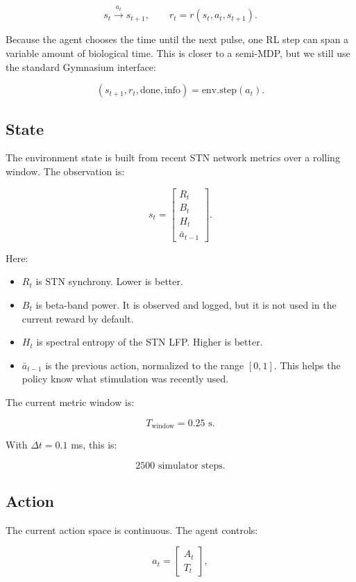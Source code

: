 \documentclass[11pt]{article}
\begin{document}
\[
s_t \xrightarrow{a_t} s_{t+1}, \qquad r_t = r(s_t, a_t, s_{t+1}).
\]

Because the agent chooses the time until the next pulse, one RL step can span a
variable amount of biological time. This is closer to a semi-MDP, but we still
use the standard Gymnasium interface:

\[
(s_{t+1}, r_t, \text{done}, \text{info}) = \text{env.step}(a_t).
\]

\subsection{State}

The environment state is built from recent STN network metrics over a rolling
window. The observation is:

\[
s_t =
\begin{bmatrix}
R_t \\
B_t \\
H_t \\
\bar{a}_{t-1}
\end{bmatrix}.
\]

Here:

\begin{itemize}[nosep]
    \item \(R_t\) is STN synchrony. Lower is better.
    \item \(B_t\) is beta-band power. It is observed and logged, but it is not
    used in the current reward by default.
    \item \(H_t\) is spectral entropy of the STN LFP. Higher is better.
    \item \(\bar{a}_{t-1}\) is the previous action, normalized to the range
    \([0, 1]\). This helps the policy know what stimulation was recently used.
\end{itemize}

The current metric window is:

\[
T_{\text{window}} = 0.25 \text{ s}.
\]

With \(\Delta t = 0.1\) ms, this is:

\[
2500 \text{ simulator steps}.
\]

\subsection{Action}

The current action space is continuous. The agent controls:

\[
a_t =
\begin{bmatrix}
A_t \\
T_t
\end{bmatrix},
\]
\end{document}
